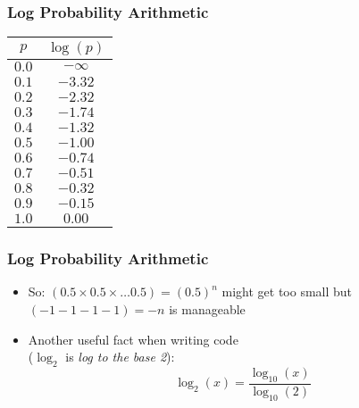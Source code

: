 \documentclass[handout]{beamer}
\begin{document}
\begin{frame}
\frametitle{Log Probability Arithmetic}
\begin{center}
\begin{tabular}{|c|c|}
\hline
$p$ & $\log(p)$ \\
\hline
$0.0$ & $- \infty$ \\
$0.1$ & $-3.32$ \\
$0.2$ & $-2.32$ \\
$0.3$ & $-1.74$ \\
$0.4$ & $-1.32$ \\
$0.5$ & $-1.00$ \\
$0.6$ & $-0.74$ \\
$0.7$ & $-0.51$ \\
$0.8$ & $-0.32$ \\
$0.9$ & $-0.15$ \\
$1.0$ & $0.00$ \\
\hline
\end{tabular}
\end{center}

\end{frame}

\begin{frame}
\frametitle{Log Probability Arithmetic}
\begin{itemize}[<+->]
\item So: $(0.5 \times 0.5 \times \ldots 0.5) = (0.5)^n$ might get too
  small but $(- 1 - 1 - 1 - 1) = - n$ is manageable
\item Another useful fact when writing code \\
($\log_2$ is {\em log to the base 2}):
\[ \log_2(x) = \frac{\log_{10}(x)}{\log_{10}(2)} \]
\end{itemize}

\end{frame}
\end{document}
